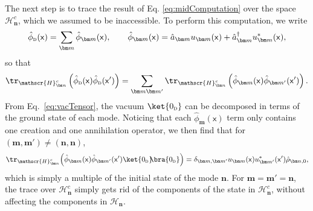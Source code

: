 \documentclass[letterpaper,12pt,titlepage,oneside,final]{book}
\newcommand{\mf}{\mathsf}%
\renewcommand{\r}{\hat{\rho}}
\newcommand{\tc}[1]{\textsc{#1}}
\begin{document}
    The next step is to trace the result of Eq. \eqref{eq:midComputation} over the space $\mathscr{H}_{\bm n}^c$, which we assumed to be inaccessible. To perform this computation, we write
    \begin{align}
        \hat{\phi}_\tc{d}(\mf x) = \sum_{\bm m} \hat{\phi}_{\bm m}(\mf x), \quad\quad \hat{\phi}_{\bm m}(\mf x) = \hat{a}_{\bm m} u_{\bm m}(\mf x)+\hat{a}_{\bm m}^\dagger u_{\bm m}^*(\mf x),
    \end{align}
    so that
    \begin{equation}
        \tr_{\mathscr{H}_{\bm n}^c}\left(\hat{\phi}_\tc{d}(\mf x) \hat{\phi}_\tc{d}(\mf x')\right) = \sum_{\bm m \bm m'} \tr_{\mathscr{H}_{{\bm n}}^c}\left(\hat{\phi}_{\bm m}(\mf x) \hat{\phi}_{\bm m'}(\mf x')\right).
    \end{equation}
    From Eq.~\eqref{eq:vacTensor}, the vacuum $\ket{0_\tc{d}}$ can be decomposed in terms of the ground state of each mode.
     Noticing that each $\hat{\phi}_{\bm m}(\mf x)$ term only contains one creation and one annihilation operator, we then find that for $(\bm m, \bm m') \neq (\bm n, \bm n)$,
    \begin{align}\label{eq:diagonal0D}
        \tr_{\mathscr{H}_{{\bm n}}^c}\Big(\hat{\phi}_{\bm m}(\mf x)\hat{\phi}_{\bm m'}(\mf x')\ket{0_\tc{d}}\!\!\bra{0_\tc{d}}\Big) = \delta_{\bm m ,\bm m'} u_{\bm m}(\mf x)  u_{\bm m'}^*(\mf x')\r_{{\bm n},0},
    \end{align}
    which is simply a multiple of the initial state of the mode $\bm n$. For $\bm m = \bm m' = \bm n$, the trace over $\mathscr{H}_{\bm n}^c$ simply gets rid of the components of the state in $\mathscr{H}_{\bm n}^c$, without affecting the components in $\mathscr{H}_{\bm n}$. 
    
\end{document}
